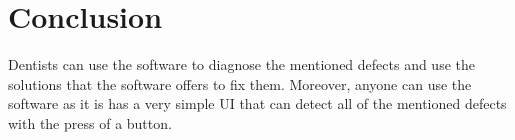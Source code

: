 \documentclass[conference,twocolumn]{IEEEtran}
\begin{document}
\section{Conclusion}
Dentists can use the software to diagnose the mentioned defects and use the solutions that the software offers to fix them. Moreover, anyone can use the software as it is has a very simple UI that can detect all of the mentioned defects with the press of a button.
\end{document}
